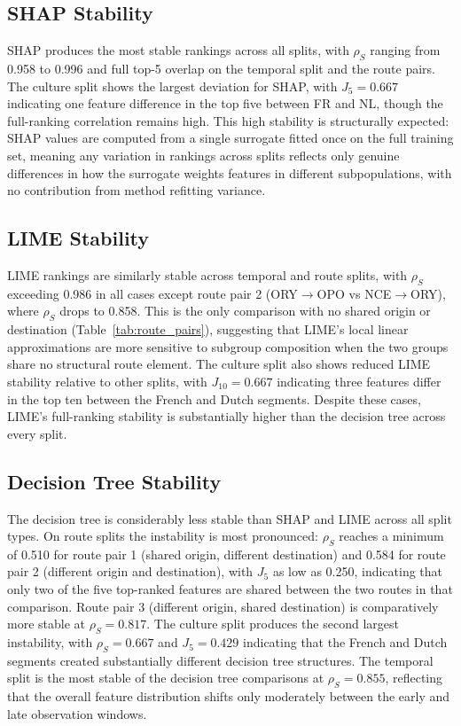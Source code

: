 \documentclass[oneside]{memoir} %
\begin{document}


\subsection{SHAP Stability}

SHAP produces the most stable rankings across all splits, with $\rho_S$ ranging from 0.958 to 0.996 and full top-5 overlap on the temporal split and the route pairs. The culture split shows the largest deviation for SHAP, with $J_5 = 0.667$ indicating one feature difference in the top five between FR and NL, though the full-ranking correlation remains high. This high stability is structurally expected: SHAP values are computed from a single surrogate fitted once on the full training set, meaning any variation in rankings across splits reflects only genuine differences in how the surrogate weights features in different subpopulations, with no contribution from method refitting variance.

\subsection{LIME Stability}
LIME rankings are similarly stable across temporal and route splits, with $\rho_S$ exceeding 0.986 in all cases except route pair 2 (ORY$\to$OPO vs NCE$\to$ORY), where $\rho_S$ drops to 0.858. This is the only comparison with no shared origin or destination (Table~\ref{tab:route_pairs}), suggesting that LIME's local linear approximations are more sensitive to subgroup composition when the two groups share no structural route element. The culture split also shows reduced LIME stability relative to other splits, with $J_{10} = 0.667$ indicating three features differ in the top ten between the French and Dutch segments. Despite these cases, LIME's full-ranking stability is substantially higher than the decision tree across every split.

\subsection{Decision Tree Stability}

The decision tree is considerably less stable than SHAP and LIME across all split types. On route splits the instability is most pronounced: $\rho_S$ reaches a minimum of 0.510 for route pair 1 (shared origin, different destination) and 0.584 for route pair 2 (different origin and destination), with $J_5$ as low as 0.250, indicating that only two of the five top-ranked features are shared between the two routes in that comparison. Route pair 3 (different origin, shared destination) is comparatively more stable at $\rho_S = 0.817$. The culture split produces the second largest instability, with $\rho_S = 0.667$ and $J_5 = 0.429$ indicating that the French and Dutch segments created substantially different decision tree structures. The temporal split is the most stable of the decision tree comparisons at $\rho_S = 0.855$, reflecting that the overall feature distribution shifts only moderately between the early and late observation windows.
\end{document}
